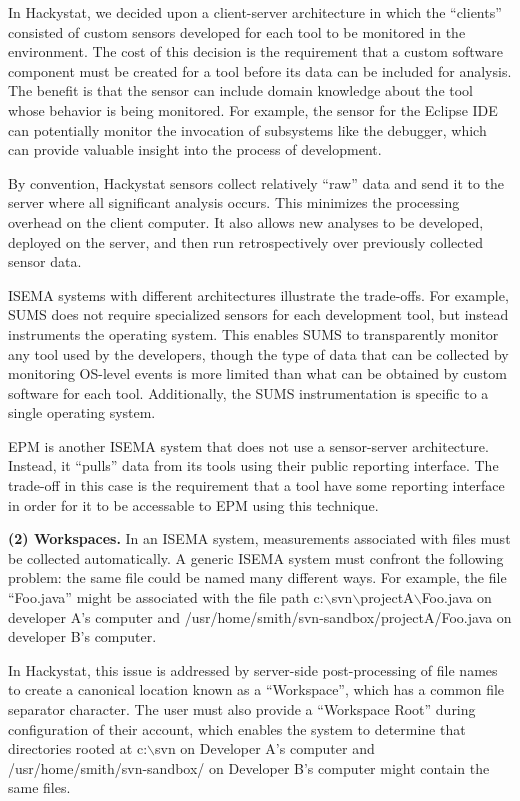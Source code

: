 \documentclass[10pt,twocolumn]{article}
\begin{document}
In Hackystat, we decided upon a client-server architecture in which the
``clients'' consisted of custom sensors developed for each tool to be
monitored in the environment.  The cost of this decision is the requirement
that a custom software component must be created for a tool before its data
can be included for analysis.  The benefit is that the sensor can include
domain knowledge about the tool whose behavior is being monitored. For
example, the sensor for the Eclipse IDE can potentially monitor the
invocation of subsystems like the debugger, which can provide valuable
insight into the process of development.  

By convention, Hackystat sensors collect relatively ``raw'' data and send
it to the server where all significant analysis occurs.  This minimizes the
processing overhead on the client computer. It also allows new analyses to
be developed, deployed on the server, and then run retrospectively over
previously collected sensor data.

ISEMA systems with different architectures illustrate the trade-offs.  For
example, SUMS does not require specialized sensors for each development
tool, but instead instruments the operating system. This enables SUMS to
transparently monitor any tool used by the developers, though the type of
data that can be collected by monitoring OS-level events is more limited
than what can be obtained by custom software for each tool.  Additionally,
the SUMS instrumentation is specific to a single operating system.

EPM is another ISEMA system that does not use a sensor-server architecture.
Instead, it ``pulls'' data from its tools using their public reporting
interface. The trade-off in this case is the requirement that a tool have
some reporting interface in order for it to be accessable to EPM using this
technique.

{\bf (2) Workspaces.}  In an ISEMA system, measurements associated with
files must be collected automatically.  A generic ISEMA system
must confront the following problem: the same file could be named many
different ways. For example, the file ``Foo.java'' might be associated with
the file path c:$\backslash$svn$\backslash$projectA$\backslash$Foo.java on
developer A's computer and /usr/home/smith/svn-sandbox/projectA/Foo.java on
developer B's computer.

In Hackystat, this issue is addressed by server-side post-processing of
file names to create a canonical location known as a ``Workspace'', which
has a common file separator character. The user must also provide a
``Workspace Root'' during configuration of their account, which enables the
system to determine that directories rooted at c:$\backslash$svn on
Developer A's computer and /usr/home/smith/svn-sandbox/ on Developer B's
computer might contain the same files. 
\end{document}
